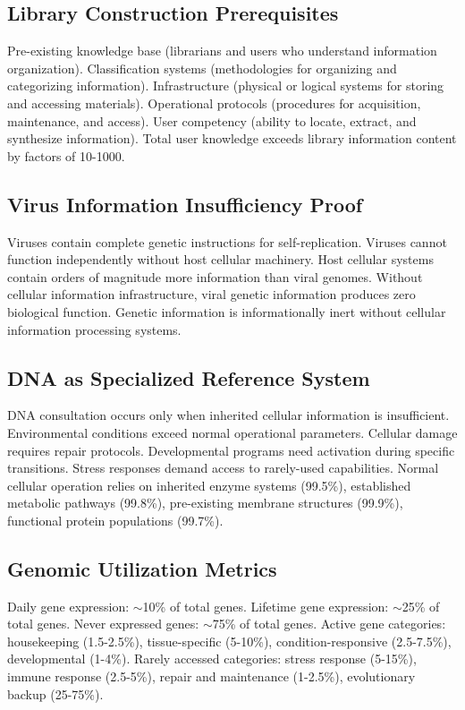\documentclass[12pt,a4paper]{article}
\begin{document}
\subsection{Library Construction Prerequisites}

Pre-existing knowledge base (librarians and users who understand information organization). Classification systems (methodologies for organizing and categorizing information). Infrastructure (physical or logical systems for storing and accessing materials). Operational protocols (procedures for acquisition, maintenance, and access). User competency (ability to locate, extract, and synthesize information). Total user knowledge exceeds library information content by factors of 10-1000.

\subsection{Virus Information Insufficiency Proof}

Viruses contain complete genetic instructions for self-replication. Viruses cannot function independently without host cellular machinery. Host cellular systems contain orders of magnitude more information than viral genomes. Without cellular information infrastructure, viral genetic information produces zero biological function. Genetic information is informationally inert without cellular information processing systems.

\subsection{DNA as Specialized Reference System}

DNA consultation occurs only when inherited cellular information is insufficient. Environmental conditions exceed normal operational parameters. Cellular damage requires repair protocols. Developmental programs need activation during specific transitions. Stress responses demand access to rarely-used capabilities. Normal cellular operation relies on inherited enzyme systems (99.5\%), established metabolic pathways (99.8\%), pre-existing membrane structures (99.9\%), functional protein populations (99.7\%).

\subsection{Genomic Utilization Metrics}

Daily gene expression: $\sim$10\% of total genes. Lifetime gene expression: $\sim$25\% of total genes. Never expressed genes: $\sim$75\% of total genes. Active gene categories: housekeeping (1.5-2.5\%), tissue-specific (5-10\%), condition-responsive (2.5-7.5\%), developmental (1-4\%). Rarely accessed categories: stress response (5-15\%), immune response (2.5-5\%), repair and maintenance (1-2.5\%), evolutionary backup (25-75\%).
\end{document}
